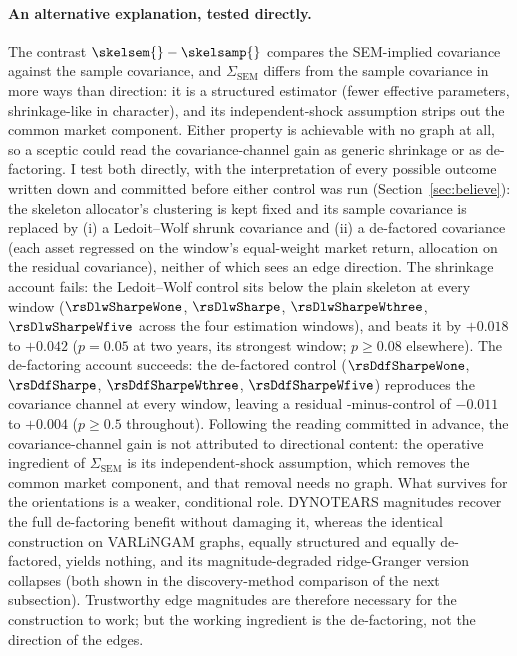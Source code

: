 \paragraph{An alternative explanation, tested directly.} The
contrast $\skelsem{}-\skelsamp{}$ compares the SEM-implied covariance
against the sample covariance, and $\Sigma_{\mathrm{SEM}}$ differs from
the sample covariance in more ways than direction: it is a structured
estimator (fewer effective parameters, shrinkage-like in character), and
its independent-shock assumption strips out the common market component.
Either property is achievable with no graph at all, so a sceptic could
read the covariance-channel gain as generic shrinkage or as
de-factoring. I test both directly, with the interpretation of every
possible outcome written down and committed before either control was
run (Section~\ref{sec:believe}): the skeleton allocator's clustering is
kept fixed and its sample covariance is replaced by (i) a Ledoit--Wolf
shrunk covariance \cite{ledoitwolf2004} and (ii) a de-factored covariance (each asset
regressed on the window's equal-weight market return, allocation on the
residual covariance), neither of which sees an edge direction. The
shrinkage account fails: the Ledoit--Wolf control sits below the plain
skeleton at every window ($\rsDlwSharpeWone$, $\rsDlwSharpe$,
$\rsDlwSharpeWthree$, $\rsDlwSharpeWfive$ across the four estimation windows), and
\skelsem{} beats it by $+0.018$ to $+0.042$ ($p=0.05$ at two years, its
strongest window; $p \geq 0.08$ elsewhere).
The de-factoring account succeeds: the de-factored control
($\rsDdfSharpeWone$, $\rsDdfSharpe$, $\rsDdfSharpeWthree$,
$\rsDdfSharpeWfive$) reproduces the covariance channel at every window,
leaving a residual \skelsem{}-minus-control of $-0.011$ to $+0.004$
($p \geq 0.5$ throughout). Following the reading committed in advance,
the
covariance-channel gain is not attributed to directional content: the
operative ingredient of $\Sigma_{\mathrm{SEM}}$ is its independent-shock
assumption, which removes the common market component, and that removal
needs no graph. What survives for the orientations is a weaker,
conditional role. DYNOTEARS magnitudes recover the full de-factoring
benefit without damaging it, whereas the identical construction on
VARLiNGAM graphs, equally structured and equally de-factored, yields
nothing, and its magnitude-degraded ridge-Granger version collapses (both
shown in the discovery-method comparison of the next subsection).
Trustworthy edge magnitudes are therefore necessary for the construction
to work; but the working ingredient is the de-factoring, not the
direction of the edges.

